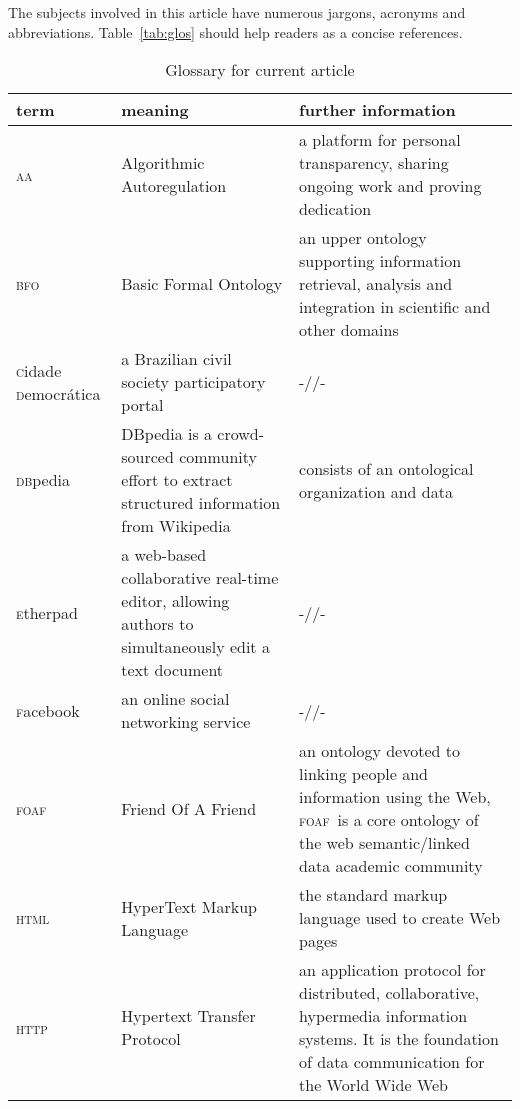 \documentclass{article}
\newcommand{\bfo}{\textsc{bfo}}
\newcommand{\dbpedia}{\textsc{db}pedia}
\newcommand{\foaf}{\textsc{foaf}}
\newcommand{\html}{\textsc{html}}
\newcommand{\facebook}{\textsc{f}acebook}
\newcommand{\etherpad}{\textsc{e}therpad}
\newcommand{\http}{\textsc{http}}
\newcommand{\aan}{\textsc{aa}}
\newcommand{\cidadedemocratica}{\textsc{c}idade \textsc{d}emocr\'atica}
\begin{document}
\vspace{-8cm}
The subjects involved in this article have numerous jargons, acronyms and abbreviations. Table~\ref{tab:glos} should help readers as a concise references.
\begin{table}[!h]
  \footnotesize
  \vspace{-6mm}
  \centering
  \caption{Glossary for current article}
  \begin{tabular}{||l|p{5cm}|p{9cm}||}\hline
      {\bf term} & {\bf meaning} & {\bf further information} \\\hline\hline
      \aan  & Algorithmic Autoregulation & a platform for personal transparency, sharing ongoing work and proving dedication \\\hline
      \bfo  & Basic Formal Ontology & an upper ontology supporting information retrieval, analysis and integration in scientific and other domains \\\hline
      \cidadedemocratica  & a Brazilian civil society participatory portal & -//- \\\hline
      \dbpedia  & DBpedia is a crowd-sourced community effort to extract structured information from Wikipedia & consists of an ontological organization and data \\\hline
      \etherpad  & a web-based collaborative real-time editor, allowing authors to simultaneously edit a text document & -//- \\\hline
      \facebook & an online social networking service & -//-  \\\hline
      \foaf  & Friend Of A Friend & an ontology devoted to linking people and information using the Web, \foaf\ is a core ontology of the web semantic/linked data academic community \\\hline
      \html  & HyperText Markup Language & the standard markup language used to create Web pages \\\hline
      \http  & Hypertext Transfer Protocol & an application protocol for distributed, collaborative, hypermedia information systems. It is the foundation of data communication for the World Wide Web \\\hline

\end{tabular}
\end{table}
\end{document}
